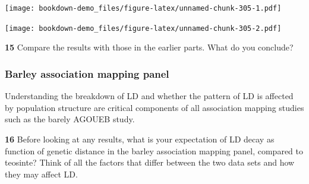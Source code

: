 \documentclass[
]{book}
\makeatletter
\newenvironment{Shaded}{\begin{snugshade}}{\end{snugshade}}
\newcommand{\AttributeTok}[1]{\textcolor[rgb]{0.77,0.63,0.00}{#1}}
\newcommand{\DecValTok}[1]{\textcolor[rgb]{0.00,0.00,0.81}{#1}}
\newcommand{\FloatTok}[1]{\textcolor[rgb]{0.00,0.00,0.81}{#1}}
\newcommand{\FunctionTok}[1]{\textcolor[rgb]{0.00,0.00,0.00}{#1}}
\newcommand{\NormalTok}[1]{#1}
\newcommand{\OtherTok}[1]{\textcolor[rgb]{0.56,0.35,0.01}{#1}}
\newcommand{\SpecialCharTok}[1]{\textcolor[rgb]{0.00,0.00,0.00}{#1}}
\newcommand{\StringTok}[1]{\textcolor[rgb]{0.31,0.60,0.02}{#1}}
\newenvironment{kframe}{%
\medskip{}
\setlength{\fboxsep}{.8em}
 \def\at@end@of@kframe{}%
 \ifinner\ifhmode%
  \def\at@end@of@kframe{\end{minipage}}%
  \begin{minipage}{\columnwidth}%
 \fi\fi%
 \def\FrameCommand##1{\hskip\@totalleftmargin \hskip-\fboxsep
 \colorbox{shadecolor}{##1}\hskip-\fboxsep
     \hskip-\linewidth \hskip-\@totalleftmargin \hskip\columnwidth}%
 \MakeFramed {\advance\hsize-\width
   \@totalleftmargin\z@ \linewidth\hsize
   \@setminipage}}%
 {\par\unskip\endMakeFramed%
 \at@end@of@kframe}
\newenvironment{rmdblock}[1]
  {
  \begin{itemize}
  \renewcommand{\labelitemi}{
    \raisebox{-.7\height}[0pt][0pt]{
      {\setkeys{Gin}{width=3em,keepaspectratio}\texttt{[image: images/\#1]}}
    }
  }
  \setlength{\fboxsep}{1em}
  \begin{kframe}
  \item
  }
  {
  \end{kframe}
  \end{itemize}
  }
\newenvironment{rmdquiz}
  {\begin{rmdblock}{quiz}}
  {\end{rmdblock}}
\makeatother
\begin{document}
\texttt{[image: bookdown-demo\_files/figure-latex/unnamed-chunk-305-1.pdf]}

\begin{Shaded}
\end{Shaded}

\texttt{[image: bookdown-demo\_files/figure-latex/unnamed-chunk-305-2.pdf]}

\begin{rmdquiz}
\textbf{15}
Compare the results with those in the earlier parts. What do you conclude?
\end{rmdquiz}

\hypertarget{barley-association-mapping-panel}{%
\subsubsection{Barley association mapping panel}\label{barley-association-mapping-panel}}

Understanding the breakdown of LD and whether the pattern of LD is affected by population structure are critical components of all association mapping studies such as the barely AGOUEB study.

\begin{rmdquiz}
\textbf{16}
Before looking at any results, what is your expectation of LD decay as function of genetic distance in the barley association mapping panel, compared to teosinte? Think of all the factors that differ between the two data sets and how they may affect LD.
\end{rmdquiz}
\end{document}
